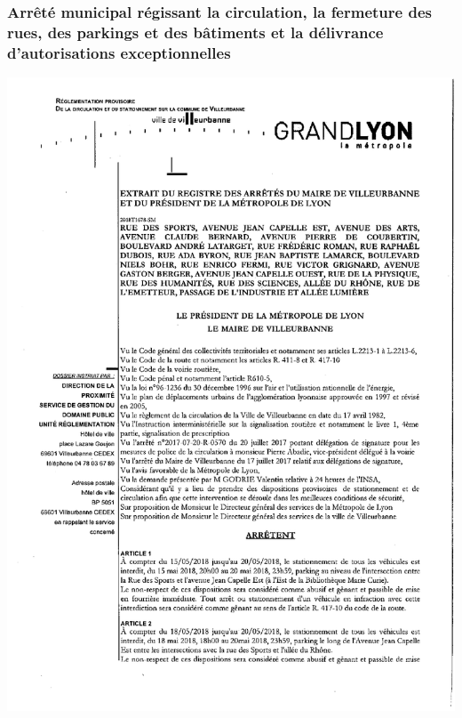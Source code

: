 \documentclass[hidelinks, paper=a4, fontsize=13pt]{report}
\begin{document}
\subsubsection{Arrêté municipal régissant la circulation, la fermeture des rues, des parkings et des bâtiments et la délivrance d'autorisations exceptionnelles}
\begin{center}
\includegraphics[scale = 0.7]{Annexes/Documents/VilleurbanneCirculation1}

\end{center}
\end{document}

